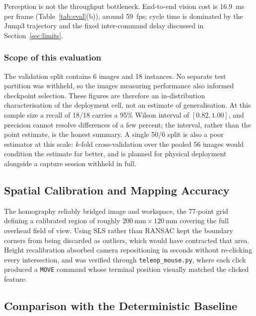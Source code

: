 \documentclass[conference]{IEEEtran}
\begin{document}
Perception is not the throughput bottleneck. End-to-end vision cost is 16.9~ms per frame (Table~\ref{tab:eval}(b)), around 59~fps; cycle time is dominated by the Jump3 trajectory and the fixed inter-command delay discussed in Section~\ref{sec:limits}.

\subsubsection*{Scope of this evaluation}
The validation split contains 6 images and 18 instances. No separate test partition was withheld, so the images measuring performance also informed checkpoint selection. These figures are therefore an in-distribution characterisation of the deployment cell, not an estimate of generalisation. At this sample size a recall of 18/18 carries a 95\% Wilson interval of $[0.82, 1.00]$, and precision cannot resolve differences of a few percent; the interval, rather than the point estimate, is the honest summary. A single 50/6 split is also a poor estimator at this scale: $k$-fold cross-validation over the pooled 56 images would condition the estimate far better, and is planned for physical deployment alongside a capture session withheld in full.

\subsection{Spatial Calibration and Mapping Accuracy}
\label{sec:spatial}

The homography reliably bridged image and workspace, the 77-point grid defining a calibrated region of roughly $200~\text{mm} \times 120~\text{mm}$ covering the full overhead field of view. Using SLS rather than RANSAC kept the boundary corners from being discarded as outliers, which would have contracted that area. Height recalibration absorbed camera repositioning in seconds without re-clicking every intersection, and was verified through \texttt{teleop\_mouse.py}, where each click produced a \texttt{MOVE} command whose terminal position visually matched the clicked feature.

\subsection{Comparison with the Deterministic Baseline}
\label{sec:baseline}
\end{document}
